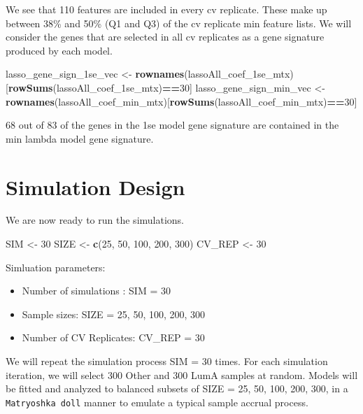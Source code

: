\documentclass[
]{book}
\newenvironment{Shaded}{\begin{snugshade}}{\end{snugshade}}
\newcommand{\DecValTok}[1]{\textcolor[rgb]{0.00,0.00,0.81}{#1}}
\newcommand{\KeywordTok}[1]{\textcolor[rgb]{0.13,0.29,0.53}{\textbf{#1}}}
\newcommand{\NormalTok}[1]{#1}
\newcommand{\OperatorTok}[1]{\textcolor[rgb]{0.81,0.36,0.00}{\textbf{#1}}}
\newcommand{\StringTok}[1]{\textcolor[rgb]{0.31,0.60,0.02}{#1}}
\begin{document}
We see that 110 features are included in every
cv replicate. These make up between
38\%
and
50\%
(Q1 and Q3) of the cv replicate min feature lists.
We will consider the genes that are selected in all cv replicates as a
gene signature produced by each model.

\begin{Shaded}
\begin{Highlighting}[]
\NormalTok{lasso\_gene\_sign\_1se\_vec <{-}}\StringTok{ }\KeywordTok{rownames}\NormalTok{(lassoAll\_coef\_1se\_mtx)[}\KeywordTok{rowSums}\NormalTok{(lassoAll\_coef\_1se\_mtx)}\OperatorTok{==}\DecValTok{30}\NormalTok{]}
\NormalTok{lasso\_gene\_sign\_min\_vec <{-}}\StringTok{ }\KeywordTok{rownames}\NormalTok{(lassoAll\_coef\_min\_mtx)[}\KeywordTok{rowSums}\NormalTok{(lassoAll\_coef\_min\_mtx)}\OperatorTok{==}\DecValTok{30}\NormalTok{]}
\end{Highlighting}
\end{Shaded}

68 out of
83 of the genes in the 1se model gene signature
are contained in the min lambda model gene signature.

\hypertarget{simulation-design-1}{%
\section{Simulation Design}\label{simulation-design-1}}

We are now ready to run the simulations.

\begin{Shaded}
\begin{Highlighting}[]
\NormalTok{ SIM <{-}}\StringTok{ }\DecValTok{30}
\NormalTok{ SIZE <{-}}\StringTok{ }\KeywordTok{c}\NormalTok{(}\DecValTok{25}\NormalTok{, }\DecValTok{50}\NormalTok{, }\DecValTok{100}\NormalTok{, }\DecValTok{200}\NormalTok{, }\DecValTok{300}\NormalTok{)}
\NormalTok{ CV\_REP <{-}}\StringTok{ }\DecValTok{30}
\end{Highlighting}
\end{Shaded}

Simluation parameters:

\begin{itemize}
\item
  Number of simulations : SIM = 30
\item
  Sample sizes: SIZE = 25, 50, 100, 200, 300
\item
  Number of CV Replicates: CV\_REP = 30
\end{itemize}

We will repeat the simulation process SIM = 30 times.
For each simulation iteration, we will select 300 Other and
300 LumA samples at random. Models will be fitted and analyzed
to balanced subsets of SIZE = 25, 50, 100, 200, 300, in a \texttt{Matryoshka\ doll} manner to
emulate a typical sample accrual process.
\end{document}
